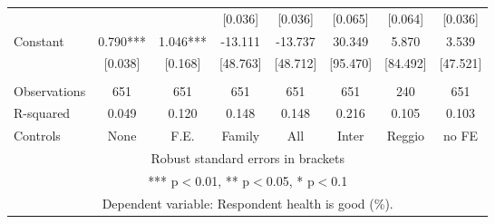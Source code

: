 \begin{tabular}{lccccccc}
 &  &  & [0.036] & [0.036] & [0.065] & [0.064] & [0.036] \\
Constant & 0.790*** & 1.046*** & -13.111 & -13.737 & 30.349 & 5.870 & 3.539 \\
 & [0.038] & [0.168] & [48.763] & [48.712] & [95.470] & [84.492] & [47.521] \\
 &  &  &  &  &  &  &  \\
Observations & 651 & 651 & 651 & 651 & 651 & 240 & 651 \\
R-squared & 0.049 & 0.120 & 0.148 & 0.148 & 0.216 & 0.105 & 0.103 \\
 Controls & None & F.E. & Family & All & Inter & Reggio & no FE \\ \hline
\multicolumn{8}{c}{ Robust standard errors in brackets} \\
\multicolumn{8}{c}{ *** p$<$0.01, ** p$<$0.05, * p$<$0.1} \\
\multicolumn{8}{c}{ Dependent variable: Respondent health is good (\%).} \\
\end{tabular}
